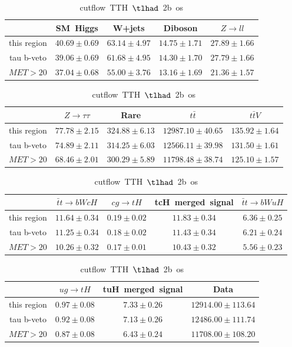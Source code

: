 \begin{table}
\footnotesize
\caption{cutflow~TTH~$\tlhad$~2b~os}
\centering
\begin{tabular}{|c|c|c|c|c|} \hline
 & SM~Higgs & W+jets & Diboson & $Z\to ll$\\\hline
this region & $40.69\pm0.69$ & $63.14\pm4.97$ & $14.75\pm1.71$ & $27.89\pm1.66$\\\hline
tau b-veto & $39.06\pm0.69$ & $61.68\pm4.95$ & $14.30\pm1.70$ & $27.79\pm1.66$\\\hline
$MET>20$ & $37.04\pm0.68$ & $55.00\pm3.76$ & $13.16\pm1.69$ & $21.36\pm1.57$\\\hline
\end{tabular}
\begin{tabular}{|c|c|c|c|c|} \hline
 & $Z\to \tau\tau$ & Rare & $t\bar{t}$ & $t\bar{t}V$\\\hline
this region & $77.78\pm2.15$ & $324.88\pm6.13$ & $12987.10\pm40.65$ & $135.92\pm1.64$\\\hline
tau b-veto & $74.89\pm2.11$ & $314.25\pm6.03$ & $12566.11\pm39.98$ & $131.50\pm1.61$\\\hline
$MET>20$ & $68.46\pm2.01$ & $300.29\pm5.89$ & $11798.48\pm38.74$ & $125.10\pm1.57$\\\hline
\end{tabular}
\begin{tabular}{|c|c|c|c|c|} \hline
 & $\bar{t}t\to bWcH$ & $cg\to tH$ & tcH~merged~signal & $\bar{t}t\to bWuH$\\\hline
this region & $11.64\pm0.34$ & $0.19\pm0.02$ & $11.83\pm0.34$ & $6.36\pm0.25$\\\hline
tau b-veto & $11.25\pm0.34$ & $0.18\pm0.02$ & $11.43\pm0.34$ & $6.21\pm0.24$\\\hline
$MET>20$ & $10.26\pm0.32$ & $0.17\pm0.01$ & $10.43\pm0.32$ & $5.56\pm0.23$\\\hline
\end{tabular}
\begin{tabular}{|c|c|c|c|} \hline
 & $ug\to tH$ & tuH~merged~signal & Data\\\hline
this region & $0.97\pm0.08$ & $7.33\pm0.26$ & $12914.00\pm113.64$\\\hline
tau b-veto & $0.92\pm0.08$ & $7.13\pm0.26$ & $12486.00\pm111.74$\\\hline
$MET>20$ & $0.87\pm0.08$ & $6.43\pm0.24$ & $11708.00\pm108.20$\\\hline
\end{tabular}
\label{tab:cutflow_reg1l1tau2b3j_os}
\end{table}
